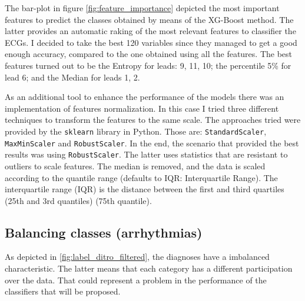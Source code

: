 The bar-plot in figure \ref{fig:feature_importance} depicted the most important features to predict the classes obtained by means of the XG-Boost method. The latter provides an automatic raking of the most relevant features to classifier the ECGs. I decided to take the best 120 variables since they managed to get a good enough accuracy, compared to the one obtained using all the features. The best features turned out to be the Entropy for leads: 9, 11, 10; the percentile 5\% for lead 6; and the Median for leads 1, 2.

As an additional tool to enhance the performance of the models there was an implementation of features normalization. In this case I tried three different techniques to transform the features to the same scale. The approaches tried were provided by the \texttt{sklearn} library in Python. Those are: \texttt{StandardScaler}, \texttt{MaxMinScaler} and \texttt{RobustScaler}. In the end, the scenario that provided the best results was using \texttt{RobustScaler}. The latter uses statistics that are resistant to outliers to scale features. The median is removed, and the data is scaled according to the quantile range (defaults to IQR: Interquartile Range). The interquartile range (IQR) is the distance between the first and third quartiles (25th and 3rd quantiles) (75th quantile).

\subsection{Balancing classes (arrhythmias)}

As depicted in \ref{fig:label_ditro_filtered}, the diagnoses have a imbalanced characteristic. The latter means that each category has a different participation over the data. That could represent a problem in the performance of the classifiers that will be proposed.

